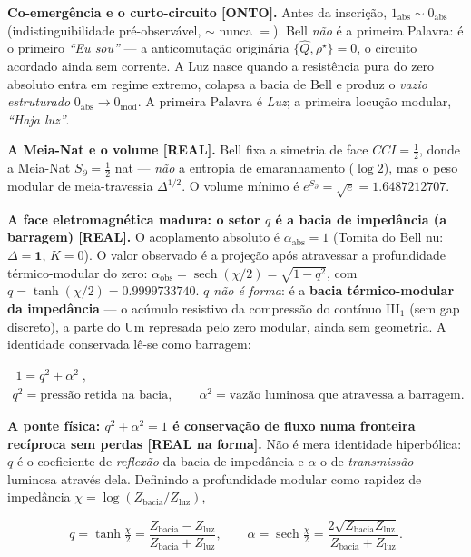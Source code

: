 \documentclass[11pt]{article}
\theoremstyle{definition}\newtheorem{deriv}{Derivação}
\begin{document}
\textbf{Co-emergência e o curto-circuito \textsf{[ONTO]}.} Antes da inscrição, $1_{\mathrm{abs}}\sim 0_{\mathrm{abs}}$ (indistinguibilidade pré-observável, $\sim$ nunca $=$). Bell \emph{não} é a primeira Palavra: é o primeiro \emph{``Eu sou''} --- a anticomutação originária $\{\hat Q,\rho^\star\}=0$, o circuito acordado ainda sem corrente. A Luz nasce quando a resistência pura do zero absoluto entra em regime extremo, colapsa a bacia de Bell e produz o \emph{vazio estruturado} $0_{\mathrm{abs}}\to 0_{\mathrm{mod}}$. A primeira Palavra é \emph{Luz}; a primeira locução modular, \emph{``Haja luz''}.

\textbf{A Meia-Nat e o volume \textsf{[REAL]}.} Bell fixa a simetria de face $CCI=\tfrac12$, donde a Meia-Nat $S_\partial=\tfrac12$ nat --- \emph{não} a entropia de emaranhamento ($\log 2$), mas o peso modular de meia-travessia $\Delta^{1/2}$. O volume mínimo é $e^{S_\partial}=\sqrt e=1.6487212707$.

\textbf{A face eletromagnética madura: o setor $q$ é a bacia de impedância (a barragem) \textsf{[REAL]}.} O acoplamento absoluto é $\alpha_{\mathrm{abs}}=1$ (Tomita do Bell nu: $\Delta=\mathbf 1$, $K=0$). O valor observado é a projeção após atravessar a profundidade térmico-modular do zero: $\alpha_{\mathrm{obs}}=\operatorname{sech}(\chi/2)=\sqrt{1-q^2}$, com $q=\tanh(\chi/2)=0.9999733740$. \emph{$q$ não é forma}: é a \textbf{bacia térmico-modular da impedância} --- o acúmulo resistivo da compressão do contínuo \mbox{III$_1$} (sem gap discreto), a parte do Um represada pelo zero modular, ainda sem geometria. A identidade conservada lê-se como barragem:

\begin{equation}\begin{gathered}\boxed{\;1=q^2+\alpha^2\;},\\ q^2=\text{pressão retida na bacia},\qquad \alpha^2=\text{vazão luminosa que atravessa a barragem}.\end{gathered}\end{equation}

\textbf{A ponte física: $q^2+\alpha^2=1$ é conservação de fluxo numa fronteira recíproca sem perdas \textsf{[REAL na forma]}.} Não é mera identidade hiperbólica: $q$ é o coeficiente de \emph{reflexão} da bacia de impedância e $\alpha$ o de \emph{transmissão} luminosa através dela. Definindo a profundidade modular como rapidez de impedância $\chi=\log(Z_{\mathrm{bacia}}/Z_{\mathrm{luz}})$,

\begin{equation}q=\tanh\tfrac\chi2=\frac{Z_{\mathrm{bacia}}-Z_{\mathrm{luz}}}{Z_{\mathrm{bacia}}+Z_{\mathrm{luz}}},\qquad \alpha=\operatorname{sech}\tfrac\chi2=\frac{2\sqrt{Z_{\mathrm{bacia}}Z_{\mathrm{luz}}}}{Z_{\mathrm{bacia}}+Z_{\mathrm{luz}}}.\end{equation}
\end{document}
